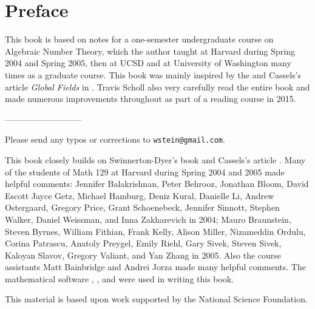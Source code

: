 \chapter*{Preface}

This book is based on notes for a one-semester
undergraduate course on Algebraic Number Theory, which the author
taught at Harvard during Spring 2004 and Spring 2005, then at UCSD
and at University of Washington many times as a graduate course.
This book was mainly inspired by the \cite[Ch.~1]{sd:brief} and
Cassels's article {\em Global Fields} in \cite{cassels:global}.
Travis Scholl also very carefully read the entire book and made
numerous improvements throughout as part of a
reading course in 2015.

\vspace{0.3in}
\begin{center}
---------------------------
\end{center}

\vspace{0.2in}
\noindent{}Please send any typos or corrections to {\tt wstein@gmail.com}.

\newpage
{} This book closely builds on
Swinnerton-Dyer's book \cite{sd:brief} and Cassels's article
\cite{cassels:global}. Many of the students of Math 129 at Harvard
during Spring 2004 and 2005 made helpful comments: Jennifer
Balakrishnan, Peter Behrooz, Jonathan Bloom, David Escott Jayce Getz,
Michael Hamburg, Deniz Kural, Danielle Li, Andrew Ostergaard, Gregory
Price, Grant Schoenebeck, Jennifer Sinnott, Stephen Walker, Daniel
Weissman, and Inna Zakharevich in 2004; Mauro Braunstein, Steven
Byrnes, William Fithian, Frank Kelly, Alison Miller, Nizameddin
Ordulu, Corina Patrascu, Anatoly Preygel, Emily Riehl, Gary Sivek,
Steven Sivek, Kaloyan Slavov, Gregory Valiant, and Yan Zhang in 2005.
Also the course assistants Matt Bainbridge and Andrei Jorza made many
helpful comments.  The mathematical software \cite{sage}, \cite{pari},
and \cite{magma} were used in writing this book.

\vspace{5ex}
\noindent{}This material is based upon work supported by the National Science
Foundation.




